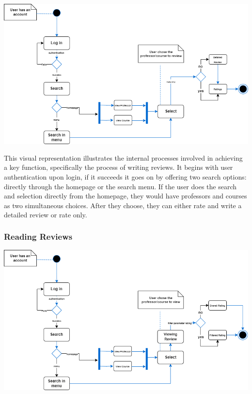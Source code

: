 \documentclass{article}
\begin{document}
\begin{center}
\includegraphics[scale=0.65]{../Diagrams/WritingReview_Activity.png}
\end{center}

\quad This visual representation illustrates the internal processes involved in achieving a key function, specifically the process of writing reviews. It begins with user authentication upon login, if it succeeds it goes on by offering two search options: directly through the homepage or the search menu. If the user does the search and selection  directly from the homepage, they would have professors and courses as two simultaneous choices. After they choose, they can either rate and write a detailed review or rate only. 

\subsubsection{Reading Reviews}


\begin{center}
\includegraphics[scale=0.65]{../Diagrams/ReadingReview_Activity.png} 
\end{center}
\end{document}
